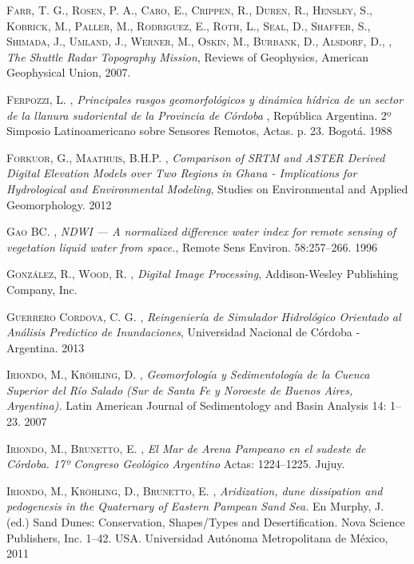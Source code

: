 \begin{thebibliography}{9}
 \textsc{Farr, T. G., Rosen, P. A., Caro, E., Crippen, R., Duren, R., Hensley, S., Kobrick, M., Paller, M., Rodriguez, E., Roth, L., Seal, D., Shaffer, S., Shimada, J., Umland, J., Werner, M., Oskin, M., Burbank, D., Alsdorf, D.,} , \textit{The Shuttle Radar Topography Mission}, Reviews of Geophysics, American Geophysical Union, 2007.


 \textsc{Ferpozzi, L.} , \textit{Principales rasgos geomorfológicos y dinámica hídrica de un sector de la llanura sudoriental de la Provincia de Córdoba} , República Argentina. 2º Simposio Latinoamericano sobre Sensores Remotos, Actas. p. 23. Bogotá. 1988

 \textsc{Forkuor, G., Maathuis, B.H.P.} , \textit{Comparison of SRTM and ASTER Derived Digital Elevation Models over Two Regions in Ghana - Implications for Hydrological and Environmental Modeling}, Studies on Environmental and Applied Geomorphology. 2012

 \textsc{Gao BC.} , \textit{NDWI — A normalized difference water index for remote sensing of vegetation liquid water from space.}, Remote Sens Environ. 58:257–266. 1996

 \textsc{González, R., Wood, R.} , \textit{Digital Image Processing}, Addison-Wesley Publishing Company, Inc.

 \textsc{Guerrero Cordova, C. G.} , \textit{Reingeniería de Simulador Hidrológico Orientado al Análisis Predictico de Inundaciones}, Universidad Nacional de Córdoba - Argentina. 2013

 \textsc{Iriondo, M., Kröhling, D.} , \textit{Geomorfología y Sedimentología de la Cuenca Superior del Río Salado (Sur de Santa Fe y Noroeste de Buenos Aires, Argentina).} Latin American Journal of Sedimentology and Basin Analysis 14: 1–23. 2007

 \textsc{Iriondo, M., Brunetto, E.} , \textit{El Mar de Arena Pampeano en el sudeste de Córdoba. 17º Congreso Geológico Argentino} Actas: 1224–1225. Jujuy.

 \textsc{Iriondo, M., Kröhling, D., Brunetto, E.} , \textit{Aridization, dune dissipation and pedogenesis in the Quaternary of Eastern Pampean Sand Sea.} En Murphy, J. (ed.) Sand Dunes: Conservation, Shapes/Types and Desertification. Nova Science Publishers, Inc. 1–42. USA. Universidad Autónoma Metropolitana de México, 2011


\end{thebibliography}

